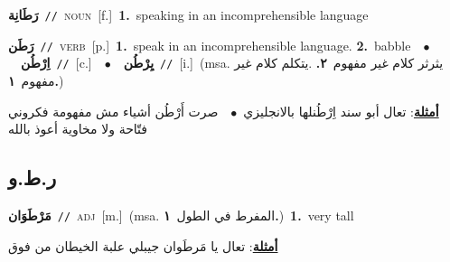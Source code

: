 \documentclass[10pt,a4paper,twoside]{article} %
\begin{document}
\begin{multicols}{2}
{\setlength\topsep{0pt}\textbf{\foreignlanguage{arabic}{رَطَانِة}}\ {\color{gray}\texttt{//}\color{black}}\ \textsc{noun}\ [f.]\ \textbf{1.}~speaking in an incomprehensible language\ } \vspace{2mm}

{\setlength\topsep{0pt}\textbf{\foreignlanguage{arabic}{رَطَن}}\ {\color{gray}\texttt{//}\color{black}}\ \textsc{verb}\ [p.]\ \textbf{1.}~speak in an incomprehensible language.  \textbf{2.}~babble\ \ $\bullet$\ \ \setlength\topsep{0pt}\textbf{\foreignlanguage{arabic}{اِرْطُن}}\ {\color{gray}\texttt{//}\color{black}}\ [c.]\ \ $\bullet$\ \ \setlength\topsep{0pt}\textbf{\foreignlanguage{arabic}{يِرْطُن}}\ {\color{gray}\texttt{//}\color{black}}\ [i.]\ \color{gray}(msa. \foreignlanguage{arabic}{يثرثر كلام غير مفهوم}~\foreignlanguage{arabic}{\textbf{٢.}}  .\foreignlanguage{arabic}{يتكلم كلام غير مفهوم}~\foreignlanguage{arabic}{\textbf{١.}})\color{black}\  \begin{flushright}\color{gray}\foreignlanguage{arabic}{\textbf{\underline{\foreignlanguage{arabic}{أمثلة}}}: تعال أبو سند اِرْطُنلها بالانجليزي\ $\bullet$\ \  صرت أَرْطُن أشياء مش مفهومة فكروني فتّاحة ولا مخاوية أعوذ بالله}\end{flushright}\color{black}} \vspace{2mm}

\vspace{-3mm}
\subsection*{\color{blue}\foreignlanguage{arabic}{ر.ط.و}\color{blue}{ (ntws)}} 

{\setlength\topsep{0pt}\textbf{\foreignlanguage{arabic}{مَرْطَوَان}}\ {\color{gray}\texttt{//}\color{black}}\ \textsc{adj}\ [m.]\ \color{gray}(msa. \foreignlanguage{arabic}{المفرط في الطول}~\foreignlanguage{arabic}{\textbf{١.}})\color{black}\ \textbf{1.}~very tall\  \begin{flushright}\color{gray}\foreignlanguage{arabic}{\textbf{\underline{\foreignlanguage{arabic}{أمثلة}}}: تعال يا مَرطَوان جيبلي علبة الخيطان من فوق}\end{flushright}\color{black}} \vspace{2mm}


\end{multicols}
\end{document}
